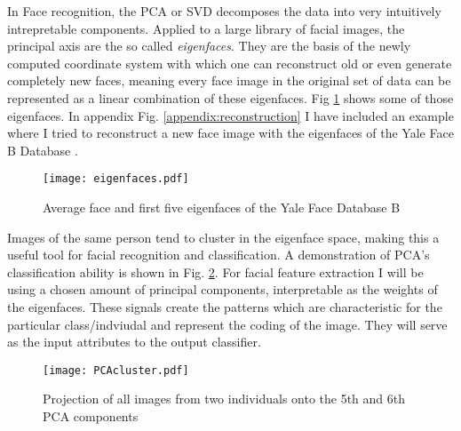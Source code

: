 In Face recognition, the PCA or SVD decomposes the data into very intuitively
intrepretable components. Applied to a large library of facial images, the
principal axis are the so called \textit{eigenfaces}. They are the basis of the
newly computed coordinate system with which one can reconstruct old or even
generate completely new faces, meaning every face image in the original set of
data can be represented as a linear combination of these eigenfaces. Fig
\ref{eigenfaces} shows some of those eigenfaces. In appendix Fig.
\ref{appendix:reconstruction} I have included an example where I tried to
reconstruct a new face image with the eigenfaces of the Yale Face B Database
\cite{yalefaceB}. 

\begin{figure}[ht]
  \centering
  \texttt{[image: eigenfaces.pdf]}
  \caption{Average face and first five eigenfaces of the Yale Face Database B}
  \label{eigenfaces}
\end{figure}

Images of the same person tend to cluster in the eigenface space, making this a
useful tool for facial recognition and classification. A demonstration of PCA's
classification ability is shown in Fig. \ref{cluster}. For facial feature
extraction I will be using a chosen amount of principal components,
interpretable as the weights of the eigenfaces. These signals create the
patterns which are characteristic for the particular class/indviudal and
represent the coding of the image. They will serve as the input attributes to
the output classifier.

\begin{figure}[ht]
  \centering
  \texttt{[image: PCAcluster.pdf]}
  \caption{Projection of all images from two individuals onto the 5th and 6th 
  PCA components}
  \label{cluster}
\end{figure}
